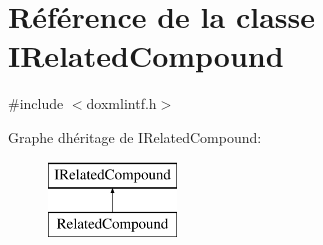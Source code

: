 \hypertarget{class_i_related_compound}{}\section{Référence de la classe I\+Related\+Compound}
\label{class_i_related_compound}


{\ttfamily \#include $<$doxmlintf.\+h$>$}

Graphe d\textquotesingle{}héritage de I\+Related\+Compound\+:\begin{figure}[H]
\begin{center}
\leavevmode
\includegraphics[height=2.000000cm]{class_i_related_compound}
\end{center}
\end{figure}
